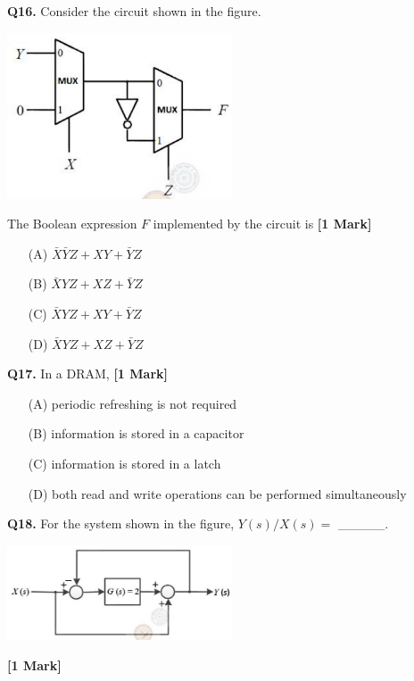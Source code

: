 \documentclass[11pt]{article}
\newcommand{\questiona}[2]{
    \noindent\textbf{Q#2.} #1 \hfill \textbf{[1 Mark]}
}
\begin{document}
\vspace{0.5cm}

\questiona{Consider the circuit shown in the figure.
\begin{center}
\includegraphics[width=0.5\textwidth]{figures/16.png}
\end{center}
The Boolean expression $F$ implemented by the circuit is}{16}
\begin{enumerate}
    \item[(A)] $\bar{X}\bar{Y}Z + XY + \bar{Y}Z$
    \item[(B)] $\bar{X}YZ + XZ + \bar{Y}Z$
    \item[(C)] $\bar{X}YZ + XY + \bar{Y}Z$
    \item[(D)] $\bar{X}YZ + XZ + \bar{Y}Z$
\end{enumerate}

\vspace{0.5cm}

\questiona{In a DRAM,}{17}
\begin{enumerate}
    \item[(A)] periodic refreshing is not required
    \item[(B)] information is stored in a capacitor
    \item[(C)] information is stored in a latch
    \item[(D)] both read and write operations can be performed simultaneously
\end{enumerate}

\vspace{0.5cm}

\questiona{For the system shown in the figure, $Y(s)/X(s) = $ \_\_\_\_\_.
\begin{center}
\includegraphics[width=0.5\textwidth]{figures/18.png}
\end{center}}{18}
\end{document}
